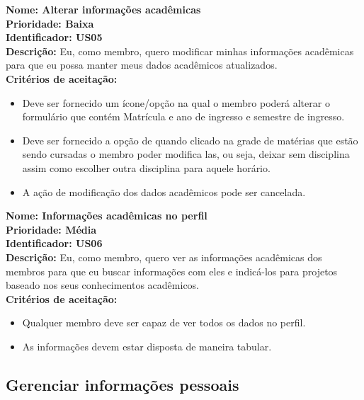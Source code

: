 \begin{anexosenv}
\indent \textbf{Nome: Alterar informações acadêmicas\\
    \indent Prioridade: Baixa\\
    \indent Identificador: US05\\
    \indent Descrição:} Eu, como membro, quero modificar minhas informações acadêmicas para que eu possa manter meus dados acadêmicos atualizados.\\
\indent \textbf{Critérios de aceitação:}        
\begin{itemize}
    \item Deve ser fornecido um ícone/opção na qual o membro poderá alterar o formulário que contém Matrícula e ano de ingresso e semestre de ingresso.
    \item Deve ser fornecido a opção de quando clicado na grade de matérias que estão sendo cursadas o membro poder modifica las, ou seja, deixar sem disciplina assim como escolher outra disciplina para aquele horário.
    \item A ação de modificação dos dados acadêmicos pode ser cancelada.
\end{itemize}

\indent \textbf{Nome: Informações acadêmicas no perfil\\
    \indent Prioridade: Média\\
    \indent Identificador: US06\\
    \indent Descrição:} Eu, como membro, quero ver as informações acadêmicas dos membros para que eu buscar informações com eles e indicá-los para projetos baseado nos seus conhecimentos acadêmicos.\\
\indent \textbf{Critérios de aceitação:}        
\begin{itemize}
    \item Qualquer membro deve ser capaz de ver todos os dados no perfil.
    \item As informações devem estar disposta de maneira tabular.
\end{itemize}

\subsection{Gerenciar informações pessoais}


\end{anexosenv}
